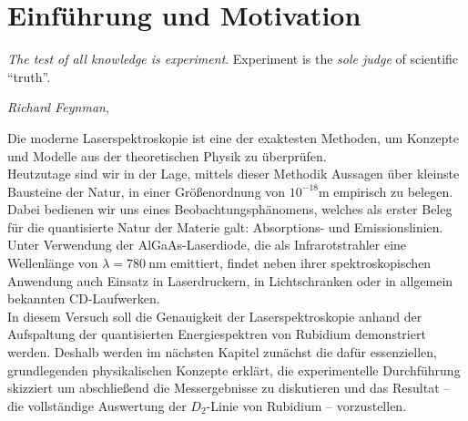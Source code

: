 \chapter{Einführung und Motivation}
\label{chap:introduction}

\epigraph{\textit{The test of all knowledge is experiment}. Experiment is the \textit{sole judge} of scientific ``truth''.}{\textit{Richard Feynman}, \cite[S. 1]{feynman1964}}

\noindent Die moderne Laserspektroskopie ist eine der exaktesten Methoden, um Konzepte und Modelle aus der theoretischen Physik zu überprüfen. \\
Heutzutage sind wir in der Lage, mittels dieser Methodik Aussagen über kleinste Bausteine der Natur, in einer Größenordnung von $10^{-18}\text{m}$ empirisch zu belegen. Dabei bedienen wir uns eines Beobachtungsphänomens, welches als erster Beleg für die quantisierte Natur der Materie galt: Absorptions- und Emissionslinien. \\
\noindent Unter Verwendung der AlGaAs-Laserdiode, die als Infrarotstrahler eine Wellenlänge von $\lambda = \SI{780}{\nano \meter}$ emittiert, findet neben ihrer spektroskopischen Anwendung auch Einsatz in Laserdruckern, in Lichtschranken oder in allgemein bekannten CD-Laufwerken.\\

\noindent In diesem Versuch soll die Genauigkeit der Laserspektroskopie anhand der Aufspaltung der quantisierten Energiespektren von Rubidium demonstriert werden. Deshalb werden im nächsten Kapitel zunächst die dafür essenziellen, grundlegenden physikalischen Konzepte erklärt, die experimentelle Durchführung skizziert um abschließend die Messergebnisse zu diskutieren und das Resultat -- die vollständige Auswertung der $D_{2}$-Linie von Rubidium -- vorzustellen.\\


\cleardoublepage{}